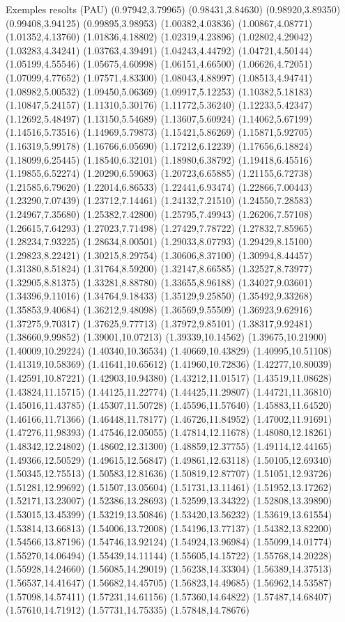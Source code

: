 \documentclass[11pt,a4paper]{article}
\begin{document}
\begin{fmex}{Exemples resolts (PAU)}
(0.97942,3.79965) (0.98431,3.84630) (0.98920,3.89350) (0.99408,3.94125) (0.99895,3.98953) (1.00382,4.03836) (1.00867,4.08771) (1.01352,4.13760) (1.01836,4.18802) (1.02319,4.23896) (1.02802,4.29042) (1.03283,4.34241) (1.03763,4.39491) (1.04243,4.44792) (1.04721,4.50144) (1.05199,4.55546) (1.05675,4.60998) (1.06151,4.66500) (1.06626,4.72051) (1.07099,4.77652) (1.07571,4.83300) (1.08043,4.88997) (1.08513,4.94741) (1.08982,5.00532) (1.09450,5.06369) (1.09917,5.12253) (1.10382,5.18183) (1.10847,5.24157) (1.11310,5.30176) (1.11772,5.36240) (1.12233,5.42347) (1.12692,5.48497) (1.13150,5.54689) (1.13607,5.60924) (1.14062,5.67199) (1.14516,5.73516) (1.14969,5.79873) (1.15421,5.86269) (1.15871,5.92705) (1.16319,5.99178) (1.16766,6.05690) (1.17212,6.12239) (1.17656,6.18824) (1.18099,6.25445) (1.18540,6.32101) (1.18980,6.38792) (1.19418,6.45516) (1.19855,6.52274) (1.20290,6.59063) (1.20723,6.65885) (1.21155,6.72738) (1.21585,6.79620) (1.22014,6.86533) (1.22441,6.93474) (1.22866,7.00443) (1.23290,7.07439) (1.23712,7.14461) (1.24132,7.21510) (1.24550,7.28583) (1.24967,7.35680) (1.25382,7.42800) (1.25795,7.49943) (1.26206,7.57108) (1.26615,7.64293) (1.27023,7.71498) (1.27429,7.78722) (1.27832,7.85965) (1.28234,7.93225) (1.28634,8.00501) (1.29033,8.07793) (1.29429,8.15100) (1.29823,8.22421) (1.30215,8.29754) (1.30606,8.37100) (1.30994,8.44457) (1.31380,8.51824) (1.31764,8.59200) (1.32147,8.66585) (1.32527,8.73977) (1.32905,8.81375) (1.33281,8.88780) (1.33655,8.96188) (1.34027,9.03601) (1.34396,9.11016) (1.34764,9.18433) (1.35129,9.25850) (1.35492,9.33268) (1.35853,9.40684) (1.36212,9.48098) (1.36569,9.55509) (1.36923,9.62916) (1.37275,9.70317) (1.37625,9.77713) (1.37972,9.85101) (1.38317,9.92481) (1.38660,9.99852) (1.39001,10.07213) (1.39339,10.14562) (1.39675,10.21900) (1.40009,10.29224) (1.40340,10.36534) (1.40669,10.43829) (1.40995,10.51108) (1.41319,10.58369) (1.41641,10.65612) (1.41960,10.72836) (1.42277,10.80039) (1.42591,10.87221) (1.42903,10.94380) (1.43212,11.01517) (1.43519,11.08628) (1.43824,11.15715) (1.44125,11.22774) (1.44425,11.29807) (1.44721,11.36810) (1.45016,11.43785) (1.45307,11.50728) (1.45596,11.57640) (1.45883,11.64520) (1.46166,11.71366) (1.46448,11.78177) (1.46726,11.84952) (1.47002,11.91691) (1.47276,11.98393) (1.47546,12.05055) (1.47814,12.11678) (1.48080,12.18261) (1.48342,12.24802) (1.48602,12.31300) (1.48859,12.37755) (1.49114,12.44165) (1.49366,12.50529) (1.49615,12.56847) (1.49861,12.63118) (1.50105,12.69340) (1.50345,12.75513) (1.50583,12.81636) (1.50819,12.87707) (1.51051,12.93726) (1.51281,12.99692) (1.51507,13.05604) (1.51731,13.11461) (1.51952,13.17262) (1.52171,13.23007) (1.52386,13.28693) (1.52599,13.34322) (1.52808,13.39890) (1.53015,13.45399) (1.53219,13.50846) (1.53420,13.56232) (1.53619,13.61554) (1.53814,13.66813) (1.54006,13.72008) (1.54196,13.77137) (1.54382,13.82200) (1.54566,13.87196) (1.54746,13.92124) (1.54924,13.96984) (1.55099,14.01774) (1.55270,14.06494) (1.55439,14.11144) (1.55605,14.15722) (1.55768,14.20228) (1.55928,14.24660) (1.56085,14.29019) (1.56238,14.33304) (1.56389,14.37513) (1.56537,14.41647) (1.56682,14.45705) (1.56823,14.49685) (1.56962,14.53587) (1.57098,14.57411) (1.57231,14.61156) (1.57360,14.64822) (1.57487,14.68407) (1.57610,14.71912) (1.57731,14.75335) (1.57848,14.78676) 
\end{fmex}
\end{document}
